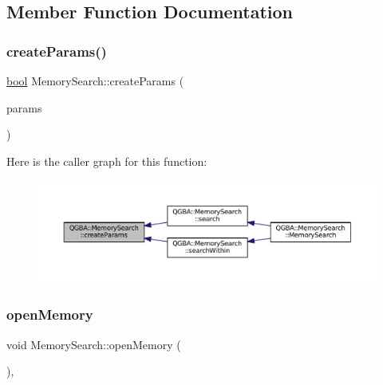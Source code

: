 \subsection{Member Function Documentation}
\mbox{\label{class_q_g_b_a_1_1_memory_search_ad70f1e9611ee54c498ed3ee0e4a03adb}} 
\subsubsection{\texorpdfstring{create\+Params()}{createParams()}}
{\footnotesize\ttfamily \mbox{\hyperlink{libretro_8h_a4a26dcae73fb7e1528214a068aca317e}{bool}} Memory\+Search\+::create\+Params (\begin{DoxyParamCaption}\item[{m\+Core\+Memory\+Search\+Params $\ast$}]{params }\end{DoxyParamCaption})\hspace{0.3cm}{\ttfamily [private]}}

Here is the caller graph for this function\+:
\nopagebreak
\begin{figure}[H]
\begin{center}
\leavevmode
\includegraphics[width=350pt]{class_q_g_b_a_1_1_memory_search_ad70f1e9611ee54c498ed3ee0e4a03adb_icgraph}
\end{center}
\end{figure}
\mbox{\label{class_q_g_b_a_1_1_memory_search_a53bcce6f42eba9e70d695fd20be8b50f}} 
\subsubsection{\texorpdfstring{open\+Memory}{openMemory}}
{\footnotesize\ttfamily void Memory\+Search\+::open\+Memory (\begin{DoxyParamCaption}{ }\end{DoxyParamCaption})\hspace{0.3cm}{\ttfamily [private]}, {\ttfamily [slot]}}

